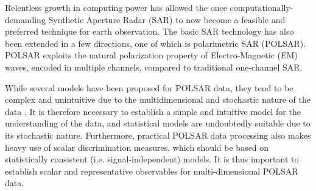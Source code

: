 \documentclass[journal]{IEEEtran}
\begin{document}
Relentless growth in computing power has allowed the once computationally-demanding Synthetic Aperture Radar (SAR) to now become a feasible and preferred technique for earth observation.
The basic SAR technology has also been extended in a few directions, one of which is polarimetric SAR (POLSAR).
POLSAR exploits the natural polarization property of Electro-Magnetic (EM) waves,
   encoded in multiple channels, compared to traditional one-channel SAR.
  

While several models have been proposed for POLSAR data, they tend to be complex and unintuitive due to the multidimensional and stochastic nature of the data \cite{Lee_1994_TGRS_1017, Lopez-Martinez_2003_TGRS_2232}.
It is therefore necessary to establish a simple and intuitive model for the 
understanding of the data, and statistical models are undoubtedly suitable due to its stochastic nature.
Furthermore, practical POLSAR data processing also makes heavy use of scalar discrimination measures,
  which should be based on statistically consistent (i.e. signal-independent) models. %
It is thus important to establish scalar and representative observables for multi-dimensional POLSAR data.
  
\end{document}
